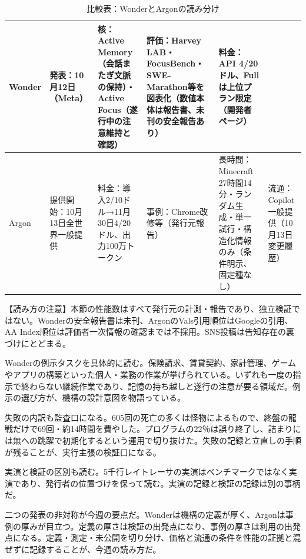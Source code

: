 \documentclass[lualatex,a4paper,10pt]{jlreq}
\begin{document}
\begin{table}[htbp]\centering\footnotesize
\caption{比較表：WonderとArgonの読み分け}
\begin{tabularx}{0.96\linewidth}{@{}lXXXXX@{}}
\toprule
Wonder & 発表：10月12日（Meta） & 核：Active Memory（会話またぎ文脈の保持）・Active Focus（遂行中の注意維持と確認） & 評価：Harvey LAB・FocusBench・SWE-Marathon等を図表化（数値本体は報告書、未刊の安全報告あり） & 料金：API 4/20ドル、Fullは上位プラン限定（開発者ページ） \cite{B01,B62,B63,B02} \\
\midrule
Argon & 提供開始：10月13日全世界一般提供 & 料金：導入2/10ドル→11月30日4/20ドル、出力100万トークン & 事例：Chrome改修等（発行元報告） & 長時間：Minecraft 27時間14分・ランダム生成・単一試行・構造化情報のみ（条件明示、固定種なし） & 流通：Copilot一般提供（10月13日変更履歴） \cite{B05,B65,B08,B04} \\
\bottomrule
\end{tabularx}
\end{table}

\begin{tcolorbox}[colback=SurveySoft,colframe=SurveyRule,arc=1mm,boxrule=0.4pt,left=2mm,right=2mm]
【読み方の注意】本節の性能数はすべて発行元の計測・報告であり、独立検証ではない。Wonderの安全報告書は未刊、ArgonのVals引用順位はGoogleの引用、AA Index順位は評価者一次情報の確認までは不採用。SNS投稿は告知存在の裏づけにとどまる。
\end{tcolorbox}
\cite{B01,B62,B63,B02,B64,B03,B05,B65,B08,B04,B07,B06}

Wonderの例示タスクを具体的に読む。保険請求、賃貸契約、家計管理、ゲームやアプリの構築といった個人・業務の作業が挙げられている。いずれも一度の指示で終わらない継続作業であり、記憶の持ち越しと遂行の注意が要る領域だ。例示の選び方が、機構の設計意図を物語っている。
\cite{B01,B62,B63,B02,B64,B03}


失敗の内訳も監査口になる。605回の死亡の多くは怪物によるもので、終盤の龍戦だけで69回・約14時間を費やした。プログラムの22％は誤り終了し、詰まりには無への跳躍で初期化するという運用で切り抜けた。失敗の記録と立直しの手順が残ることが、実行主張の検証口になる。
\cite{B05,B65,B08,B04,B07,B06}


実演と検証の区別も読む。5千行レイトレーサの実演はベンチマークではなく実演であり、発行者の位置づけを保って読む。実演の記録と検証の記録は別の事柄だ。
\cite{B05,B65,B08,B04,B07,B06}


二つの発表の非対称が今週の要点だ。Wonderは機構の定義が厚く、Argonは事例の厚みが目立つ。定義の厚さは検証の出発点になり、事例の厚さは利用の出発点になる。定義・測定・未公開を切り分け、価格と流通の条件を性能の証拠と混ぜずに記録することが、今週の読み方だ。
\cite{B01,B62,B63,B02,B64,B03,B05,B65,B08,B04,B07,B06}
\end{document}
